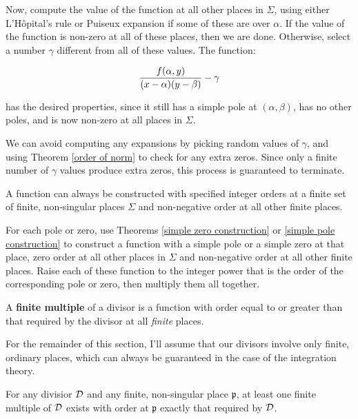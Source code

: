 Now, compute the value of the function at all other places in
$\Sigma$, using either L'H\^opital's rule or Puiseux expansion if some
of these are over $\alpha$.  If the value of the function is non-zero
at all of these places, then we are done.  Otherwise, select a number
$\gamma$ different from all of these values.  The function:

$${f(\alpha,y)\over(x-\alpha)(y-\beta)} - \gamma$$

has the desired properties, since it still has a simple pole at
$(\alpha,\beta)$, has no other poles, and is now non-zero at all
places in $\Sigma$.

We can avoid computing any expansions by picking random values of
$\gamma$, and using Theorem \ref{order of norm} to check for any extra
zeros.  Since only a finite number of $\gamma$ values produce extra
zeros, this process is guaranteed to terminate.


\endtheorem

\theorem
\label{finite orders construction}

A function can always be constructed with specified integer orders at
a finite set of finite, non-singular places $\Sigma$ and non-negative
order at all other finite places.

\proof

For each pole or zero, use Theorems \ref{simple zero construction} or
\ref{simple pole construction} to construct a function with a simple
pole or a simple zero at that place, zero order at all other places in
$\Sigma$ and non-negative order at all other finite places.  Raise
each of these function to the integer power that is the order of the
corresponding pole or zero, then multiply them all together.

\endtheorem


A {\bf finite multiple} of a divisor is a function with order equal to
or greater than that required by the divisor at all {\it finite} places.

\enddefinition

For the remainder of this section, I'll assume that our divisors
involve only finite, ordinary places, which can always be guaranteed
in the case of the integration theory.

\theorem
\label{exact order existance}

For any divisior ${\cal D}$ and any finite, non-singular place
$\mathfrak{p}$, at least one finite multiple of ${\cal D}$ exists with
order at $\mathfrak{p}$ exactly that required by ${\cal D}$.

